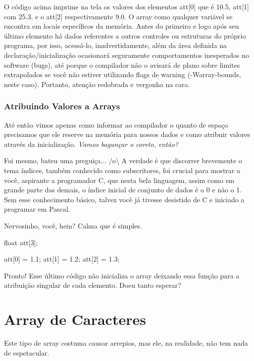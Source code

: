 O código acima imprime na tela os valores dos elementos att[0] que é 10.5,
att[1] com 25.3, e o att[2] respectivamente 9.0. O array como qualquer variável
se encontra em locais específicos da memória. Antes do primeiro e logo após seu
último elemento há dados referentes a outros controles ou estruturas do próprio
programa, por isso, acessá-lo, inadvertidamente, além da área definida na
declaração/inicialização ocasionará seguramente comportamentos inesperados no
software (bugs), até porque o compilador não o avisará de plano sobre limites
extrapolados se você não estiver utilizando flags de warning (-Warray-bounds,
neste caso). Portanto, atenção redobrada e vergonha na cara.

\subsubsection{Atribuindo Valores a Arrays}
Até então vimos apenas como informar ao compilador o quanto de espaço
precisamos que ele reserve na memória para nossos dados e como atribuir valores
através da inicialização. \textit{Vamos bagunçar o coreto, então?}


Foi mesmo, bateu uma preguiça... /o{\textbackslash} A verdade é que discorrer
brevemente o tema índices, também conhecido como subscritores, foi crucial para
mostrar a você, aspirante a programador C, que nesta bela linguagem, assim como
em grande parte das demais, o índice inicial de conjunto de dados é o 0 e não o
1. Sem esse conhecimento básico, talvez você já tivesse desistido de C e
iniciado a programar em Pascal.


Nervosinho, você, hein? Calma que é simples.

\begin{ccode}
  float att[3];

  att[0] = 1.1;
  att[1] = 1.2;
  att[2] = 1.3;
\end{ccode}

Pronto! Esse último código não inicializa o array deixando essa função para a
atribuição singular de cada elemento. Doeu tanto esperar?

\section{Array de Caracteres}
Este tipo de array costuma causar arrepios, mas ele, na realidade, não tem nada
de espetacular.

